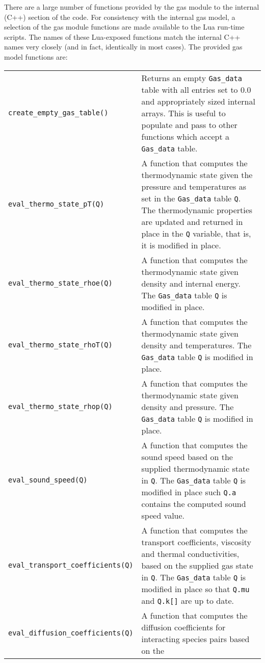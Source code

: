 There are a large number of functions provided by the gas module to the internal
(C++) section of the code.
For consistency with the internal gas model, a selection of the gas module
functions are made available to the Lua run-time scripts.
The names of these Lua-exposed functions match the internal C++ names very
closely (and in fact, identically in most cases).
The provided gas model functions are:\\
\begin{tabular}{p{6.2cm}p{10cm}} 
 \noalign{\smallskip} \hline \noalign{\smallskip}
 \texttt{create\_empty\_gas\_table()} & Returns an empty \texttt{Gas\_data} table with all entries set to 0.0 and appropriately sized internal arrays. This is useful to populate and pass to other functions which accept a \texttt{Gas\_data} table. \\
 \texttt{eval\_thermo\_state\_pT(Q)} & A function that computes the thermodynamic state given the pressure and temperatures as set in the \texttt{Gas\_data} table \texttt{Q}. The thermodynamic properties are updated and returned in place in the \texttt{Q} variable, that is, it is modified in place. \\
 \texttt{eval\_thermo\_state\_rhoe(Q)} & A function that computes the thermodynamic state given density and internal energy. The \texttt{Gas\_data} table \texttt{Q} is modified in place. \\
 \texttt{eval\_thermo\_state\_rhoT(Q)} & A function that computes the thermodynamic state given density and temperatures. The \texttt{Gas\_data} table \texttt{Q} is modified in place. \\
\texttt{eval\_thermo\_state\_rhop(Q)} & A function that computes the thermodynamic state given density and pressure. The \texttt{Gas\_data} table \texttt{Q} is modified in place. \\
\texttt{eval\_sound\_speed(Q)} &  A function that computes the sound speed based on the supplied thermodynamic state in \texttt{Q}. The \texttt{Gas\_data} table \texttt{Q} is modified in place such \texttt{Q.a} contains the computed
sound speed value. \\
\texttt{eval\_transport\_coefficients(Q)} & A function that computes the
transport coefficients, viscosity and thermal conductivities, based on the
supplied gas state in \texttt{Q}. The \texttt{Gas\_data} table \texttt{Q} is
modified in place so that \texttt{Q.mu} and \texttt{Q.k[]} are up to date. \\
\texttt{eval\_diffusion\_coefficients(Q)} & A function that computes the
diffusion coefficients for interacting species pairs based on the

\end{tabular}
